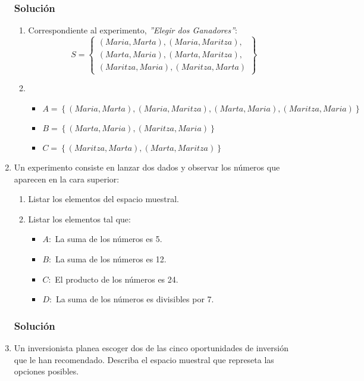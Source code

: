 \begin{enumerate}
\subsubsection{Solución}
\begin{enumerate}
\item Correspondiente al experimento, \textit{''Elegir dos Ganadores''}:
\begin{equation*}
S=
\left\lbrace 
\begin{aligned}
(Maria,Marta),(Maria,Maritza), \\
(Marta,Maria),(Marta,Maritza), \\
(Maritza,Maria),(Maritza,Marta)
\end{aligned}
\right\rbrace 
\end{equation*}
\item
\begin{itemize}
\item $A=\left\lbrace (Maria,Marta),(Maria,Maritza),(Marta,Maria),(Maritza,Maria)\right\rbrace $
\item $B=\left\lbrace (Marta,Maria),(Maritza,Maria)\right\rbrace$
\item $C=\left\lbrace (Maritza,Marta),(Marta,Maritza)\right\rbrace$
\end{itemize}
\end{enumerate}
\item Un experimento consiste en lanzar dos dados y observar los números que aparecen en la cara superior:
\begin{enumerate}
\item Listar los elementos del espacio muestral.
\item Listar los elementos tal que:
\begin{itemize}
\item $A:$ La suma de los números es 5.
\item $B:$ La suma de los números es 12.
\item $C:$ El producto de los números es 24.
\item $D:$ La suma de los números es divisibles por 7.
\end{itemize}
\end{enumerate}
\subsubsection{Solución}
\item Un inversionista planea escoger dos de las cinco oportunidades de inversión que le han recomendado. Describa el espacio muestral que represeta las opciones posibles.

\end{enumerate}
